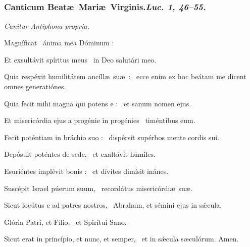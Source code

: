 \documentclass[12pt]{article} %
\newenvironment{psalmtext}{\leftskip 0.25in}{\vspace{2 mm}}
\newenvironment{rubric}{\vspace{2 mm}\color{benred8} \itshape \leftskip 0in \setlength{\parindent}{0.25in}}{\vspace{2 mm}}
\let\oldgresixstar\gresixstar
\renewcommand{\gresixstar}{\textcolor{benred8}{\oldgresixstar}}
\def\capitulumSpace{\hspace{20 mm}}
\begin{document}

\subsection*{}

\subsubsection*{Canticum Beat\ae\ Mari\ae\ Virginis.\capitulumSpace \emph{Luc. 1, 46--55.}}

\begin{rubric}
Canitur Antiphona propria.

\end{rubric}

\begin{psalmtext}
\lettrine[lhang=0.70]{M}{a}gn\'{i}ficat \gresixstar\ \'{a}nima mea D\'{o}minum :

\hspace*{9.5 mm}Et exsult\'{a}vit sp\'{i}ritus meus \gresixstar\ in Deo salut\'{a}ri meo.

Quia resp\'{e}xit humilit\'{a}tem anc\'{i}ll\ae\ su\ae\ : \gresixstar\ ecce enim ex hoc be\'{a}tam me dicent omnes generati\'{o}nes.

Quia fecit mihi magna qui potens e : \gresixstar\ et sanum nomen ejus.

Et miseric\'{o}rdia ejus a prog\'{e}nie in prog\'{e}nies \gresixstar\ tim\'{e}ntibus eum.

Fecit pot\'{e}ntiam in br\'{a}chio suo : \gresixstar\ disp\'{e}rsit sup\'{e}rbos mente cordis sui.

Dep\'{o}suit pot\'{e}ntes de sede, \gresixstar\ et exalt\'{a}vit h\'{u}miles.

Esuri\'{e}ntes impl\'{e}vit bonis : \gresixstar\ et d\'{i}vites dim\'{i}sit in\'{a}nes.

Susc\'{e}pit Israel p\'{u}erum suum, \gresixstar\ record\'{a}tus miseric\'{o}rdi\ae\ su\ae.

Sicut loc\'{u}tus e ad patres nostros, \gresixstar\ Abraham, et s\'{e}mini ejus in s\'{\ae}cula.

Glória Patri, et Fílio, \gresixstar\ et Spirítui Sano.

Sicut erat in princípio, et nunc, et semper, \gresixstar\ et in sǽcula sæculórum. Amen.

\end{psalmtext}
\end{document}

